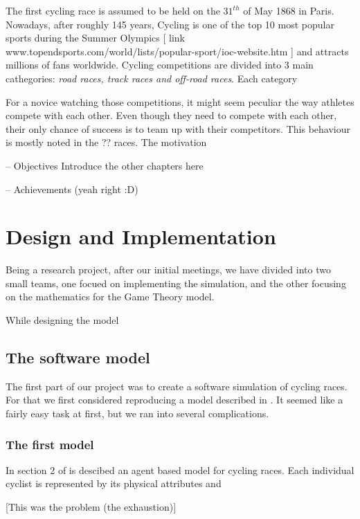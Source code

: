 \documentclass[10pt, a4paper]{report}
\begin{document}
The first cycling race is assumed to be held on the $31^{th}$ of May 1868 in Paris. Nowadays, after roughly 145 years, Cycling is one of the top 10 most popular sports during the Summer Olympics [ link www.topendsports.com/world/lists/popular-sport/ioc-website.htm ] and attracts millions of fans worldwide. Cycling competitions are divided into 3 main cathegories: \textit{road races, track races and off-road races}. Each category


For a novice watching those competitions, it might seem peculiar the way athletes compete with each other. Even though they need to compete with each other, their only chance of success is to team up with their competitors. This behaviour is mostly noted in the ?? races. The motivation


-- Objectives
Introduce the other chapters here


-- Achievements (yeah right :D)

\chapter{Design and Implementation}

Being a research project, after our initial meetings, we have divided into two small teams, one focued on implementing the simulation, and the other focusing on the mathematics for the Game Theory model.

While designing the model



\section{The software model}

The first part of our project was to create a software simulation of cycling races. For that we first considered reproducing a model described in \cite{AgentModel}. It seemed like a fairly easy task at first, but we ran into several complications.

\subsection{The first model}

In section 2 of \cite{AgentModel} is descibed an agent based model for cycling races. Each individual cyclist is represented by its physical attributes and 

[This was the problem (the exhaustion)]
\end{document}
